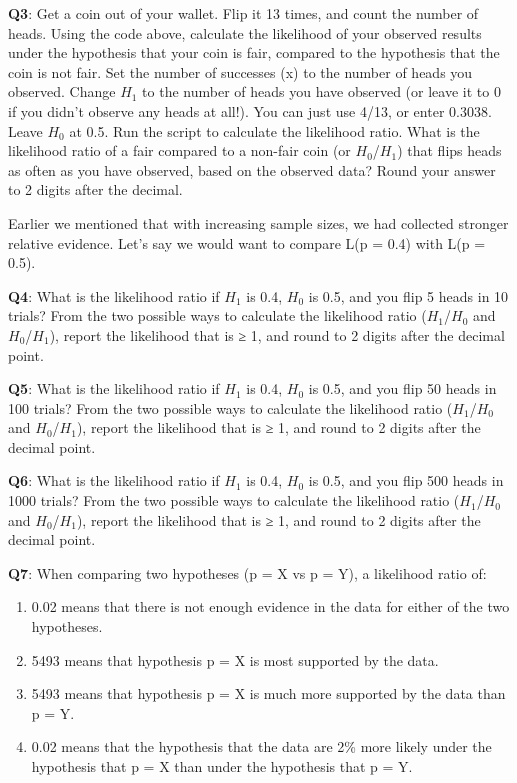 \documentclass[
  oneside]{book}
\providecommand{\tightlist}{%
  \setlength{\itemsep}{0pt}\setlength{\parskip}{0pt}}
\begin{document}
\textbf{Q3}: Get a coin out of your wallet. Flip it 13 times, and count the number of heads. Using the code above, calculate the likelihood of your observed results under the hypothesis that your coin is fair, compared to the hypothesis that the coin is not fair. Set the number of successes (x) to the number of heads you observed. Change \(H_1\) to the number of heads you have observed (or leave it to 0 if you didn't observe any heads at all!). You can just use 4/13, or enter 0.3038. Leave \(H_0\) at 0.5. Run the script to calculate the likelihood ratio. What is the likelihood ratio of a fair compared to a non-fair coin (or \(H_0\)/\(H_1\)) that flips heads as often as you have observed, based on the observed data? Round your answer to 2 digits after the decimal.

Earlier we mentioned that with increasing sample sizes, we had collected stronger relative evidence. Let's say we would want to compare L(p = 0.4) with L(p = 0.5).

\textbf{Q4}: What is the likelihood ratio if \(H_1\) is 0.4, \(H_0\) is 0.5, and you flip 5 heads in 10 trials? From the two possible ways to calculate the likelihood ratio (\(H_1\)/\(H_0\) and \(H_0\)/\(H_1\)), report the likelihood that is ≥ 1, and round to 2 digits after the decimal point.

\textbf{Q5}: What is the likelihood ratio if \(H_1\) is 0.4, \(H_0\) is 0.5, and you flip 50 heads in 100 trials? From the two possible ways to calculate the likelihood ratio (\(H_1\)/\(H_0\) and \(H_0\)/\(H_1\)), report the likelihood that is ≥ 1, and round to 2 digits after the decimal point.

\textbf{Q6}: What is the likelihood ratio if \(H_1\) is 0.4, \(H_0\) is 0.5, and you flip 500 heads in 1000 trials? From the two possible ways to calculate the likelihood ratio (\(H_1\)/\(H_0\) and \(H_0\)/\(H_1\)), report the likelihood that is ≥ 1, and round to 2 digits after the decimal point.

\textbf{Q7}: When comparing two hypotheses (p = X vs p = Y), a likelihood ratio of:

\begin{enumerate}
\def\labelenumi{\Alph{enumi})}
\tightlist
\item
  0.02 means that there is not enough evidence in the data for either of the two hypotheses.
\item
  5493 means that hypothesis p = X is most supported by the data.
\item
  5493 means that hypothesis p = X is much more supported by the data than p = Y.
\item
  0.02 means that the hypothesis that the data are 2\% more likely under the hypothesis that p = X than under the hypothesis that p = Y.
\end{enumerate}
\end{document}
